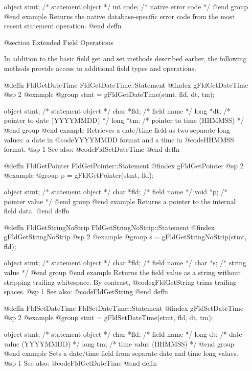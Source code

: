 object  stmt;   /*  statement object      */
int     code;   /*  native error code     */
@end group
@end example
Returns the native database-specific error code from the most recent
statement operation.
@end deffn



@section Extended Field Operations

In addition to the basic field get and set methods described earlier,
the following methods provide access to additional field types and
operations.


@deffn {FldGetDateTime} FldGetDateTime::Statement
@findex gFldGetDateTime
@sp 2
@example
@group
stmt = gFldGetDateTime(stmt, fld, dt, tm);

object  stmt;   /*  statement object         */
char    *fld;   /*  field name               */
long    *dt;    /*  pointer to date (YYYYMMDD) */
long    *tm;    /*  pointer to time (HHMMSS)   */
@end group
@end example
Retrieves a date/time field as two separate long values: a date in
@code{YYYYMMDD} format and a time in @code{HHMMSS} format.
@sp 1
See also:  @code{FldSetDateTime}
@end deffn



@deffn {FldGetPointer} FldGetPointer::Statement
@findex gFldGetPointer
@sp 2
@example
@group
p = gFldGetPointer(stmt, fld);

object  stmt;   /*  statement object  */
char    *fld;   /*  field name        */
void    *p;     /*  pointer value     */
@end group
@end example
Returns a pointer to the internal field data.
@end deffn



@deffn {FldGetStringNoStrip} FldGetStringNoStrip::Statement
@findex gFldGetStringNoStrip
@sp 2
@example
@group
s = gFldGetStringNoStrip(stmt, fld);

object  stmt;   /*  statement object  */
char    *fld;   /*  field name        */
char    *s;     /*  string value      */
@end group
@end example
Returns the field value as a string without stripping trailing
whitespace.  By contrast, @code{gFldGetString} trims trailing spaces.
@sp 1
See also:  @code{FldGetString}
@end deffn



@deffn {FldSetDateTime} FldSetDateTime::Statement
@findex gFldSetDateTime
@sp 2
@example
@group
stmt = gFldSetDateTime(stmt, fld, dt, tm);

object  stmt;   /*  statement object          */
char    *fld;   /*  field name                */
long    dt;     /*  date value (YYYYMMDD)     */
long    tm;     /*  time value (HHMMSS)       */
@end group
@end example
Sets a date/time field from separate date and time long values.
@sp 1
See also:  @code{FldGetDateTime}
@end deffn



